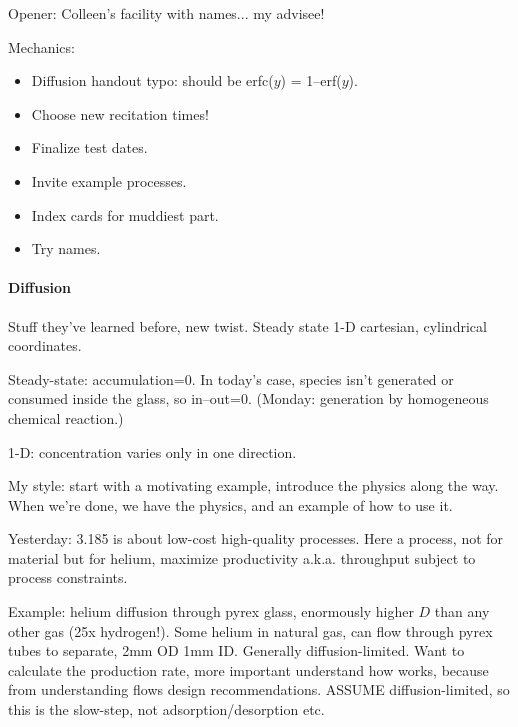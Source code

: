 \documentclass{report}
\begin{document}
\noindent Opener: Colleen's facility with names... my advisee!

Mechanics:
\begin{itemize}
\item Diffusion handout typo: should be erfc($y$) = 1--erf($y$).
\item Choose new recitation times!
\item Finalize test dates.
\item Invite example processes.
\item Index cards for muddiest part.
\item Try names.
\end{itemize}

\paragraph{Diffusion}
Stuff they've learned before, new twist.  Steady state 1-D cartesian,
cylindrical coordinates.

Steady-state: accumulation=0.  In today's case, species isn't generated or
consumed inside the glass, so in--out=0.  (Monday: generation by homogeneous
chemical reaction.)

1-D: concentration varies only in one direction.

My style: start with a motivating example, introduce the physics along the
way.  When we're done, we have the physics, and an example of how to use it.

Yesterday: 3.185 is about low-cost high-quality processes.  Here a process, not
for material but for helium, maximize productivity a.k.a. throughput subject to
process constraints.

Example: helium diffusion through pyrex glass, enormously higher $D$ than any
other gas (25x hydrogen!).  Some helium in natural gas, can flow through pyrex
tubes to separate, 2mm OD 1mm ID.  Generally diffusion-limited.  Want to
calculate the production rate, more important understand how works, because
from understanding flows design recommendations.  ASSUME diffusion-limited, so
this is the slow-step, not adsorption/desorption etc.
\end{document}
